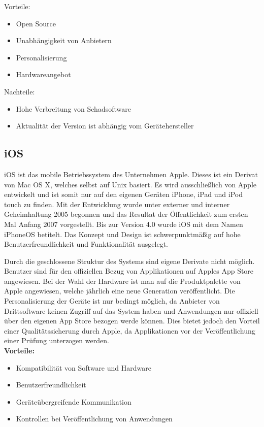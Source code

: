 Vorteile:
\begin{itemize}
	\item Open Source
	\item Unabhängigkeit von Anbietern
	\item Personalisierung
	\item Hardwareangebot
\end{itemize}

Nachteile:
\begin{itemize}
	\item Hohe Verbreitung von Schadsoftware
	\item Aktualität der Version ist abhängig vom Gerätehersteller
\end{itemize}

\subsection{iOS}
iOS ist das mobile Betriebssystem des Unternehmen Apple. Dieses ist ein Derivat von Mac OS X, welches selbst auf Unix basiert. Es wird ausschließlich von Apple entwickelt und ist somit nur auf den eigenen Geräten iPhone, iPad und iPod touch zu finden. Mit der Entwicklung wurde unter externer und interner Geheimhaltung 2005 begonnen und das Resultat der Öffentlichkeit zum ersten Mal Anfang 2007 vorgestellt. Bis zur Version 4.0 wurde iOS mit dem Namen iPhoneOS betitelt. Das Konzept und Design ist schwerpunktmäßig auf hohe Benutzerfreundlichkeit und Funktionalität ausgelegt. 

Durch die geschlossene Struktur des Systems sind eigene Derivate nicht möglich. Benutzer sind für den offiziellen Bezug von Applikationen auf Apples App Store angewiesen.
Bei der Wahl der Hardware ist man auf die Produktpalette von Apple angewiesen, welche jährlich eine neue Generation veröffentlicht. Die Personalisierung der Geräte ist nur bedingt möglich, da Anbieter von Drittsoftware keinen Zugriff auf das System haben und Anwendungen nur offiziell über den eigenen App Store bezogen werde können. Dies bietet jedoch den Vorteil einer Qualitätssicherung durch Apple, da Applikationen vor der Veröffentlichung einer Prüfung unterzogen werden.
\\

\textbf{Vorteile:}
\begin{itemize}
	\item Kompatibilität von Software und Hardware
	\item Benutzerfreundlichkeit
	\item Geräteübergreifende Kommunikation
	\item Kontrollen bei Veröffentlichung von Anwendungen
\end{itemize}

